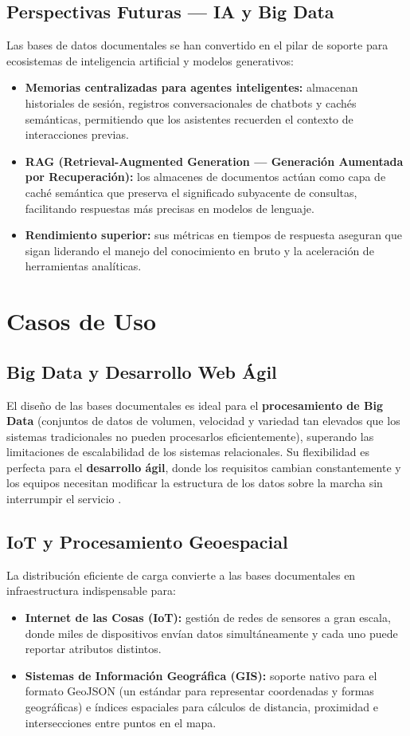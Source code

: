 \documentclass[conference]{IEEEtran}
\begin{document}
\subsection{Perspectivas Futuras — IA y Big Data}
Las bases de datos documentales se han convertido en el pilar de soporte para ecosistemas de inteligencia artificial y modelos generativos:
\begin{itemize}
    \item \textbf{Memorias centralizadas para agentes inteligentes:} almacenan historiales de sesión, registros conversacionales de chatbots y cachés semánticas, permitiendo que los asistentes recuerden el contexto de interacciones previas.
    \item \textbf{RAG (Retrieval-Augmented Generation — Generación Aumentada por Recuperación):} los almacenes de documentos actúan como capa de caché semántica que preserva el significado subyacente de consultas, facilitando respuestas más precisas en modelos de lenguaje.
    \item \textbf{Rendimiento superior:} sus métricas en tiempos de respuesta aseguran que sigan liderando el manejo del conocimiento en bruto y la aceleración de herramientas analíticas.
\end{itemize}

\section{Casos de Uso}

\subsection{Big Data y Desarrollo Web Ágil}
El diseño de las bases documentales es ideal para el \textbf{procesamiento de Big Data} (conjuntos de datos de volumen, velocidad y variedad tan elevados que los sistemas tradicionales no pueden procesarlos eficientemente), superando las limitaciones de escalabilidad de los sistemas relacionales. Su flexibilidad es perfecta para el \textbf{desarrollo ágil}, donde los requisitos cambian constantemente y los equipos necesitan modificar la estructura de los datos sobre la marcha sin interrumpir el servicio \cite{carvalho2023}.

\subsection{IoT y Procesamiento Geoespacial}
La distribución eficiente de carga convierte a las bases documentales en infraestructura indispensable para:
\begin{itemize}
    \item \textbf{Internet de las Cosas (IoT):} gestión de redes de sensores a gran escala, donde miles de dispositivos envían datos simultáneamente y cada uno puede reportar atributos distintos.
    \item \textbf{Sistemas de Información Geográfica (GIS):} soporte nativo para el formato GeoJSON (un estándar para representar coordenadas y formas geográficas) e índices espaciales para cálculos de distancia, proximidad e intersecciones entre puntos en el mapa.
\end{itemize}
\end{document}
